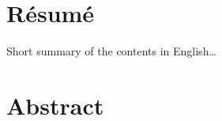 \begingroup
\let\clearpage\relax
\let\cleardoublepage\relax
\let\cleardoublepage\relax

\chapter*{Résumé}
Short summary of the contents in English\dots


\vfill

\chapter*{Abstract}


\endgroup			

\vfill
